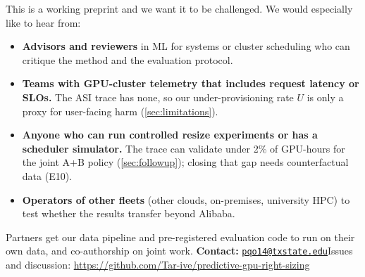 \documentclass[11pt]{article}
\begin{document}
\begin{abstract}
compatibility add little, while low-priority pods fail to become ready 21.6 points more often. This document preserves the full research trail (hypotheses, experiments, failures, and comparisons), gives a verdict on each hypothesis, positions the results against commercial GPU schedulers at Google, AWS, Microsoft, NVIDIA, Meta, and Alibaba itself, quantifies business value, and concludes that GPU and CPU must be sized together: a better GPU predictor alone cannot deliver the savings.
\end{abstract}

\begin{keybox}
\small
This is a working preprint and we want it to be challenged. We would especially like to hear from:
\begin{itemize}[leftmargin=1.2em,itemsep=1pt,topsep=2pt]
  \item \textbf{Advisors and reviewers} in ML for systems or cluster scheduling who can critique the method and the evaluation protocol.
  \item \textbf{Teams with GPU-cluster telemetry that includes request latency or SLOs.} The ASI trace has none, so our under-provisioning rate $U$ is only a proxy for user-facing harm (\cref{sec:limitations}).
  \item \textbf{Anyone who can run controlled resize experiments or has a scheduler simulator.} The trace can validate under 2\% of GPU-hours for the joint A+B policy (\cref{sec:followup}); closing that gap needs counterfactual data (E10).
  \item \textbf{Operators of other fleets} (other clouds, on-premises, university HPC) to test whether the results transfer beyond Alibaba.
\end{itemize}
Partners get our data pipeline and pre-registered evaluation code to run on their own data, and co-authorship on joint work.
\textbf{Contact:} \href{mailto:pqo14@txstate.edu}{\texttt{pqo14@txstate.edu}}\newline Issues and discussion: \url{https://github.com/Tar-ive/predictive-gpu-right-sizing}
\end{keybox}
\end{document}
